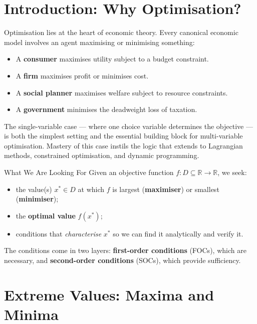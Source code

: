 \documentclass[12pt, a4paper]{article}
\theoremstyle{definition}
\newcommand{\R}{\mathbb{R}}
\begin{document}
\newpage
\tableofcontents
\newpage

\section{Introduction: Why Optimisation?}

Optimisation lies at the heart of economic theory.
Every canonical economic model involves an agent maximising or minimising
something:
\begin{itemize}
  \item A \textbf{consumer} maximises utility subject to a budget constraint.
  \item A \textbf{firm} maximises profit or minimises cost.
  \item A \textbf{social planner} maximises welfare subject to resource
        constraints.
  \item A \textbf{government} minimises the deadweight loss of taxation.
\end{itemize}

The single-variable case --- where one choice variable determines the objective
--- is both the simplest setting and the essential building block for
multi-variable optimisation.  Mastery of this case instils the logic that
extends to Lagrangian methods, constrained optimisation, and dynamic
programming.

\begin{keybox}{What We Are Looking For}
Given an objective function $f : D \subseteq \R \to \R$, we seek:
\begin{itemize}
  \item the value(s) $x^* \in D$ at which $f$ is largest (\textbf{maximiser})
        or smallest (\textbf{minimiser});
  \item the \textbf{optimal value} $f(x^*)$;
  \item conditions that \emph{characterise} $x^*$ so we can find it
        analytically and verify it.
\end{itemize}
The conditions come in two layers: \textbf{first-order conditions} (FOCs),
which are necessary, and \textbf{second-order conditions} (SOCs), which
provide sufficiency.
\end{keybox}

\section{Extreme Values: Maxima and Minima}
\end{document}
